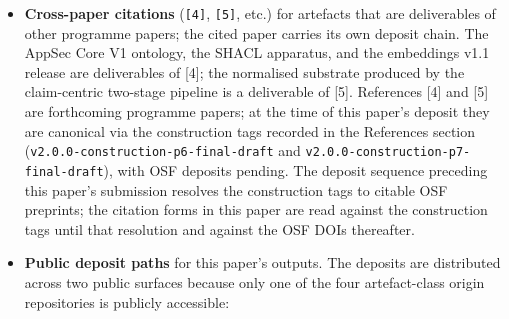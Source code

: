 \documentclass[
]{article}
\providecommand{\tightlist}{%
  \setlength{\itemsep}{0pt}\setlength{\parskip}{0pt}}
\begin{document}
\begin{itemize}
\tightlist
\item
  \textbf{Cross-paper citations} (\texttt{{[}4{]}}, \texttt{{[}5{]}},
  etc.) for artefacts that are deliverables of other programme papers;
  the cited paper carries its own deposit chain. The AppSec Core V1
  ontology, the SHACL apparatus, and the embeddings v1.1 release are
  deliverables of {[}4{]}; the normalised substrate produced by the
  claim-centric two-stage pipeline is a deliverable of {[}5{]}.
  References {[}4{]} and {[}5{]} are forthcoming programme papers; at
  the time of this paper's deposit they are canonical via the
  construction tags recorded in the References section
  (\texttt{v2.0.0-construction-p6-final-draft} and
  \texttt{v2.0.0-construction-p7-final-draft}), with OSF deposits
  pending. The deposit sequence preceding this paper's submission
  resolves the construction tags to citable OSF preprints; the citation
  forms in this paper are read against the construction tags until that
  resolution and against the OSF DOIs thereafter.
\item
  \textbf{Public deposit paths} for this paper's outputs. The deposits
  are distributed across two public surfaces because only one of the
  four artefact-class origin repositories is publicly accessible:


\end{itemize}
\end{document}
